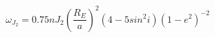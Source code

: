 \begin{equation*}
\omega_{J}_{2} = 0.75nJ_{2}(\frac{R_{E}}{a})^{2}(4 - 5sin^{2}i)(1 - e^{2})^{-2} \tag{4.51}
\end{equation*}
